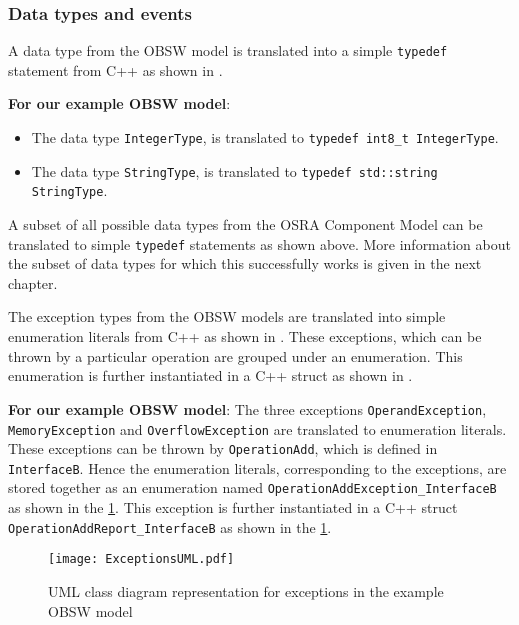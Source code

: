 \subsubsection{\textbf{Data types and events}}
A data type from the OBSW model is translated into a simple \texttt{typedef} statement from C++ as shown in \cite{MDSDBook}\cite{typedefRationale}.

\textbf{For our example OBSW model}:
\begin{itemize}
\item The data type \texttt{IntegerType}, is translated to \texttt{typedef\allowbreak \ int8\_t IntegerType}.
\item The data type \texttt{StringType}, is translated to \texttt{typedef\allowbreak \ std::string StringType}.
\end{itemize}

A subset of all possible data types from the OSRA Component Model can be translated to simple \texttt{typedef} statements as shown above. More information about the subset of data types for which this successfully works is given in the next chapter. 

The exception types from the OBSW models are translated into simple enumeration literals from C++ as shown in \cite{ExceptionClasses}. These exceptions, which can be thrown by a particular operation are grouped under an enumeration. This enumeration is further instantiated in a C++ struct as shown in \cite{ExceptionClasses}.

\textbf{For our example OBSW model}: The three exceptions \texttt{Operand\allowbreak Exception}, \texttt{Memory\allowbreak Exception} and \texttt{Overflow\allowbreak Exception} are translated to enumeration literals. These exceptions can be thrown by \texttt{OperationAdd}, which is defined in \texttt{InterfaceB}. Hence the enumeration literals, corresponding to the exceptions, are stored together as an enumeration named \texttt{OperationAdd\allowbreak Exception\allowbreak\_InterfaceB} as shown in the \cref{fig: ExceptionsUML}. This exception is further instantiated in a C++ struct \texttt{OperationAdd\allowbreak Report\allowbreak\_InterfaceB} as shown in the \cref{fig: ExceptionsUML}. 

\begin{figure}[h]
	\centering
	\texttt{[image: ExceptionsUML.pdf]}
	\caption{UML class diagram representation for exceptions in the example OBSW model}
	\label{fig: ExceptionsUML}
\end{figure}

